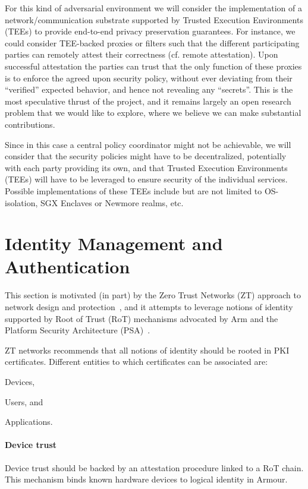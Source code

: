 \documentclass[a4paper]{article}
\newcommand{\armour}{{\sc Armour}}
\newcommand{\ZT}{{\sc ZT}}
\newcommand{\rot}{RoT}
\newcommand{\psa}{PSA}
\begin{document}
\begin{enumerate}
  For this kind of adversarial environment we will consider the
  implementation of a network/communication substrate supported by
  Trusted Execution Environments (TEEs) to provide end-to-end privacy
  preservation guarantees.
  For instance, we could consider TEE-backed proxies or filters such
  that the different participating parties can remotely attest their
  correctness (cf. remote attestation).
  Upon successful attestation the parties can trust that the only
  function of these proxies is to enforce the agreed upon security
  policy, without ever deviating from their ``verified'' expected
  behavior, and hence not revealing any ``secrets''. 
  This is the most speculative thrust of the project, and it remains
  largely an open research problem that we would like to explore,
  where we believe we can make substantial contributions. 

  Since in this case a central policy coordinator might not be
  achievable, we will consider that the security policies might have to
  be decentralized, potentially with each party providing its own, and
  that Trusted Execution Environments (TEEs) will have to be leveraged
  to ensure security of the individual services.
  Possible implementations of these TEEs include but are not limited
  to OS-isolation, SGX Enclaves or Newmore realms, etc.
\end{enumerate}


\section{Identity Management and Authentication}
\label{sec:identity-management}

This section is motivated (in part) by the Zero Trust Networks (\ZT{})
approach to network design and protection~\cite{GilmanB17}, and it
attempts to leverage notions of identity supported by Root of Trust
(\rot{}) mechanisms advocated by Arm and the Platform Security
Architecture (\psa{})~\cite{PSA}.

\ZT{} networks recommends that all notions of identity should be
rooted in PKI certificates.
%
Different entities to which certificates can be associated are:
\begin{inparaenum}
\item Devices, 
\item Users, and
\item Applications. 
\end{inparaenum}

\paragraph{Device trust}
Device trust should be backed by an attestation procedure linked to a
RoT chain.
%
This mechanism binds known hardware devices to logical identity in
\armour{}.
\end{document}
